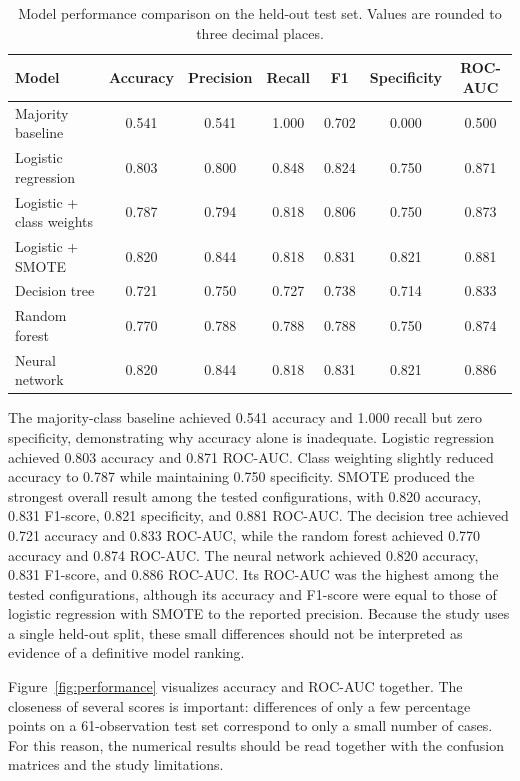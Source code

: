 \documentclass[10pt]{article}
\begin{document}
\begin{table}[t]
\caption{Model performance comparison on the held-out test set. Values are rounded to three decimal places.}
\label{tab:results}
\centering
\begin{tabular}{lcccccc}
\toprule
Model & Accuracy & Precision & Recall & F1 & Specificity & ROC-AUC\\
\midrule
Majority baseline & 0.541 & 0.541 & 1.000 & 0.702 & 0.000 & 0.500\\
Logistic regression & 0.803 & 0.800 & 0.848 & 0.824 & 0.750 & 0.871\\
Logistic + class weights & 0.787 & 0.794 & 0.818 & 0.806 & 0.750 & 0.873\\
Logistic + SMOTE & 0.820 & 0.844 & 0.818 & 0.831 & 0.821 & 0.881\\
Decision tree & 0.721 & 0.750 & 0.727 & 0.738 & 0.714 & 0.833\\
Random forest & 0.770 & 0.788 & 0.788 & 0.788 & 0.750 & 0.874\\
Neural network & 0.820 & 0.844 & 0.818 & 0.831 & 0.821 & 0.886\\
\bottomrule
\end{tabular}
\end{table}

The majority-class baseline achieved 0.541 accuracy and 1.000 recall but zero specificity, demonstrating why accuracy alone is inadequate. Logistic regression achieved 0.803 accuracy and 0.871 ROC-AUC. Class weighting slightly reduced accuracy to 0.787 while maintaining 0.750 specificity. SMOTE produced the strongest overall result among the tested configurations, with 0.820 accuracy, 0.831 F1-score, 0.821 specificity, and 0.881 ROC-AUC. The decision tree achieved 0.721 accuracy and 0.833 ROC-AUC, while the random forest achieved 0.770 accuracy and 0.874 ROC-AUC. The neural network achieved 0.820 accuracy, 0.831 F1-score, and 0.886 ROC-AUC. Its ROC-AUC was the highest among the tested configurations, although its accuracy and F1-score were equal to those of logistic regression with SMOTE to the reported precision. Because the study uses a single held-out split, these small differences should not be interpreted as evidence of a definitive model ranking.


Figure~\ref{fig:performance} visualizes accuracy and ROC-AUC together. The closeness of several scores is important: differences of only a few percentage points on a 61-observation test set correspond to only a small number of cases. For this reason, the numerical results should be read together with the confusion matrices and the study limitations.
\end{document}
